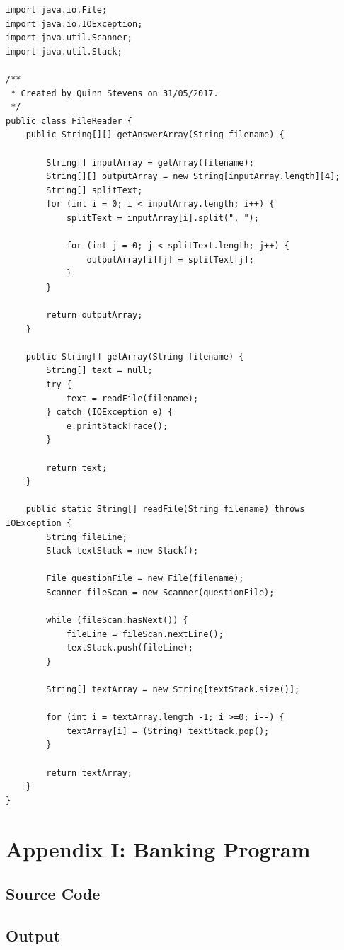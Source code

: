 \documentclass{report}
\begin{document}
\begin{verbatim}
import java.io.File;
import java.io.IOException;
import java.util.Scanner;
import java.util.Stack;

/**
 * Created by Quinn Stevens on 31/05/2017.
 */
public class FileReader {
    public String[][] getAnswerArray(String filename) {

        String[] inputArray = getArray(filename);
        String[][] outputArray = new String[inputArray.length][4];
        String[] splitText;
        for (int i = 0; i < inputArray.length; i++) {
            splitText = inputArray[i].split(", ");

            for (int j = 0; j < splitText.length; j++) {
                outputArray[i][j] = splitText[j];
            }
        }

        return outputArray;
    }

    public String[] getArray(String filename) {
        String[] text = null;
        try {
            text = readFile(filename);
        } catch (IOException e) {
            e.printStackTrace();
        }

        return text;
    }

    public static String[] readFile(String filename) throws IOException {
        String fileLine;
        Stack textStack = new Stack();

        File questionFile = new File(filename);
        Scanner fileScan = new Scanner(questionFile);

        while (fileScan.hasNext()) {
            fileLine = fileScan.nextLine();
            textStack.push(fileLine);
        }

        String[] textArray = new String[textStack.size()];

        for (int i = textArray.length -1; i >=0; i--) {
            textArray[i] = (String) textStack.pop();
        }

        return textArray;
    }
}
\end{verbatim}

\chapter*{Appendix I: Banking Program}
\section{Source Code}
\section{Output}
\end{document}
